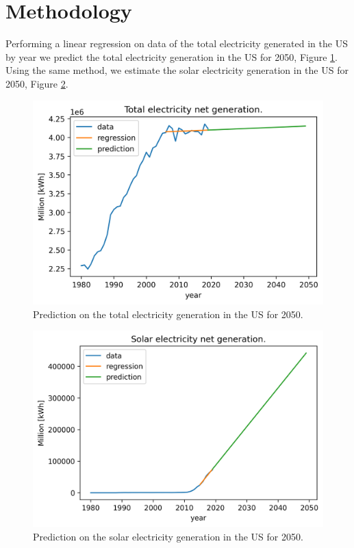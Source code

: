 \documentclass{anstrans}
\begin{document}
\section{Methodology}
\label{method}

Performing a linear regression on data of the total electricity generated in the US by year \cite{us_energy_information_administration_electric_2020} we predict the total electricity generation in the \gls{US} for 2050, Figure \ref{fig:us-pred1}.
Using the same method, we estimate the solar electricity generation in the \gls{US} for 2050, Figure \ref{fig:us-pred2}.

\begin{figure}[H]
	\centering
	\includegraphics[width=1.0\linewidth]{figures/us-prediction1.png}
	\hfill
	\caption{Prediction on the total electricity generation in the \gls{US} for 2050.}
	\label{fig:us-pred1}
\end{figure}

\begin{figure}[H]
	\centering
	\includegraphics[width=1.0\linewidth]{figures/us-prediction2.png}
	\hfill
	\caption{Prediction on the solar electricity generation in the \gls{US} for 2050.}
	\label{fig:us-pred2}
\end{figure}
\end{document}

